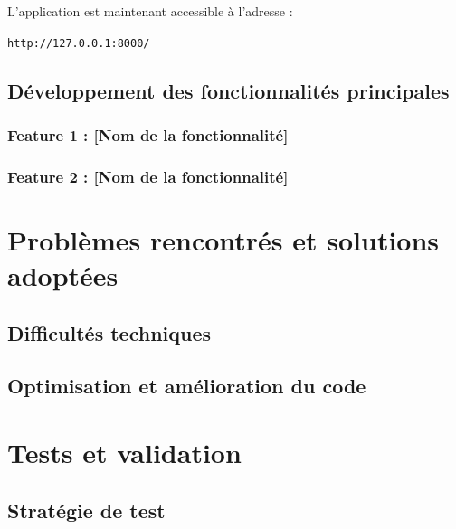 L’application est maintenant accessible à l’adresse :

\begin{tcolorbox}[colback=black, coltext=white, title=URL d’accès, fonttitle=\bfseries]
\texttt{http://127.0.0.1:8000/}
\end{tcolorbox}






\subsection{Développement des fonctionnalités principales}

\subsubsection{Feature 1 : [Nom de la fonctionnalité]}

\subsubsection{Feature 2 : [Nom de la fonctionnalité]}

\section{Problèmes rencontrés et solutions adoptées}
\subsection{Difficultés techniques}

\subsection{Optimisation et amélioration du code}

\section{Tests et validation}
\subsection{Stratégie de test}

